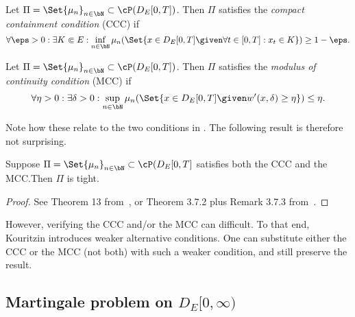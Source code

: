 \begin{definition}[CCC]
  Let \( \Pi = \Set{\mu_n}_{n\in\bN} \subset \cP(D_{E}[0,T]) \).
  Then \(\Pi\) satisfies the \textit{compact containment condition} (CCC) if
  \begin{equation}
    \forall \eps > 0 : \exists K \Subset E : \inf_{n\in\bN} \mu_n(\Set{x \in D_E[0,T] \given \forall t \in [0,T] : x_t \in K}) \geq 1 - \eps.
  \end{equation}
\end{definition}

\begin{definition}[MCC]
  Let \( \Pi = \Set{\mu_n}_{n\in\bN} \subset \cP(D_{E}[0,T]) \).
  Then \(\Pi\) satisfies the \textit{modulus of continuity condition} (MCC) if
  \begin{equation}
    \forall \eta > 0 : \exists \delta > 0 : \sup_{n\in\bN} \mu_n(\Set{x \in D_E[0,T] \given w'(x,\delta) \geq \eta}) \leq \eta.
  \end{equation}
\end{definition}

Note how these relate to the two conditions in .
The following result is therefore not surprising.

\begin{theorem}
  Suppose \(\Pi = \Set{\mu_n}_{n\in\bN} \subset \cP(D_{E}[0,T]\) satisfies both the CCC and the MCC.\@ Then \(\Pi\) is tight.
  \end{theorem}

  \begin{proof}
    See Theorem 13 from~\cite{kouritzinTightnessProbabilityMeasures2015}, or Theorem 3.7.2 plus Remark 3.7.3 from~\cite{ethierMarkovProcessesCharacterization1985}.
  \end{proof}

  However, verifying the CCC and/or the MCC can difficult.
  To that end, Kouritzin introduces weaker alternative conditions.
  One can substitute either the CCC or the MCC (not both) with such a weaker condition, and still preserve the result.

  \subsection{Martingale problem on \texorpdfstring{\(D_E[0,\infty)\)}{D([0,infinity), E)}}\label{sec:martingale-problem}

